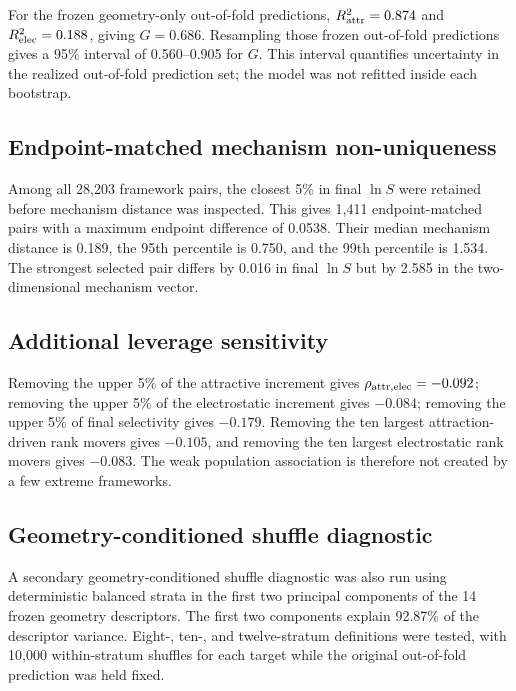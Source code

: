 \documentclass[11pt,a4paper]{article}
\begin{document}
For the frozen geometry-only out-of-fold predictions, $R^2_{\rm attr}=0.874$ and $R^2_{\rm elec}=0.188$, giving $G=0.686$. Resampling those frozen out-of-fold predictions gives a 95\% interval of 0.560--0.905 for $G$. This interval quantifies uncertainty in the realized out-of-fold prediction set; the model was not refitted inside each bootstrap.

\subsection{Endpoint-matched mechanism non-uniqueness}

Among all 28,203 framework pairs, the closest 5\% in final $\ln S$ were retained before mechanism distance was inspected. This gives 1,411 endpoint-matched pairs with a maximum endpoint difference of 0.0538. Their median mechanism distance is 0.189, the 95th percentile is 0.750, and the 99th percentile is 1.534. The strongest selected pair differs by 0.016 in final $\ln S$ but by 2.585 in the two-dimensional mechanism vector.

\subsection{Additional leverage sensitivity}

Removing the upper 5\% of the attractive increment gives $\rho_{\rm attr,elec}=-0.092$; removing the upper 5\% of the electrostatic increment gives $-0.084$; removing the upper 5\% of final selectivity gives $-0.179$. Removing the ten largest attraction-driven rank movers gives $-0.105$, and removing the ten largest electrostatic rank movers gives $-0.083$. The weak population association is therefore not created by a few extreme frameworks.

\subsection{Geometry-conditioned shuffle diagnostic}

A secondary geometry-conditioned shuffle diagnostic was also run using deterministic balanced strata in the first two principal components of the 14 frozen geometry descriptors. The first two components explain 92.87\% of the descriptor variance. Eight-, ten-, and twelve-stratum definitions were tested, with 10,000 within-stratum shuffles for each target while the original out-of-fold prediction was held fixed.
\end{document}
